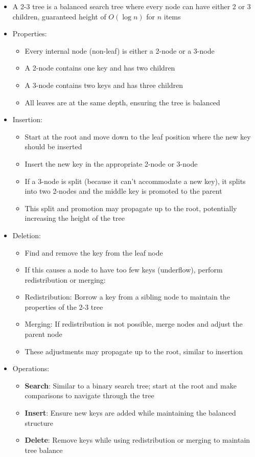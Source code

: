 \documentclass{article}
\begin{document}
\begin{itemize}
    \item A 2-3 tree is a balanced search tree where every node can have either 2 or 3 children, guaranteed height of $O(\log n)$ for $n$ items
    \item Properties:
    \begin{itemize}
        \item Every internal node (non-leaf) is either a 2-node or a 3-node
        \item A 2-node contains one key and has two children
        \item A 3-node contains two keys and has three children
        \item All leaves are at the same depth, ensuring the tree is balanced
    \end{itemize}
    \item Insertion:
    \begin{itemize}
        \item Start at the root and move down to the leaf position where the new key should be inserted
        \item Insert the new key in the appropriate 2-node or 3-node
        \item If a 3-node is split (because it can't accommodate a new key), it splits into two 2-nodes and the middle key is promoted to the parent
        \item This split and promotion may propagate up to the root, potentially increasing the height of the tree
    \end{itemize}
    \item Deletion:
    \begin{itemize}
        \item Find and remove the key from the leaf node
        \item If this causes a node to have too few keys (underflow), perform redistribution or merging:
        \item Redistribution: Borrow a key from a sibling node to maintain the properties of the 2-3 tree
        \item Merging: If redistribution is not possible, merge nodes and adjust the parent node
        \item These adjustments may propagate up to the root, similar to insertion
    \end{itemize}
    \item Operations:
    \begin{itemize}
        \item \textbf{Search}: Similar to a binary search tree; start at the root and make comparisons to navigate through the tree
        \item \textbf{Insert}: Ensure new keys are added while maintaining the balanced structure
        \item \textbf{Delete}: Remove keys while using redistribution or merging to maintain tree balance
    \end{itemize}
\end{itemize}
\end{document}
